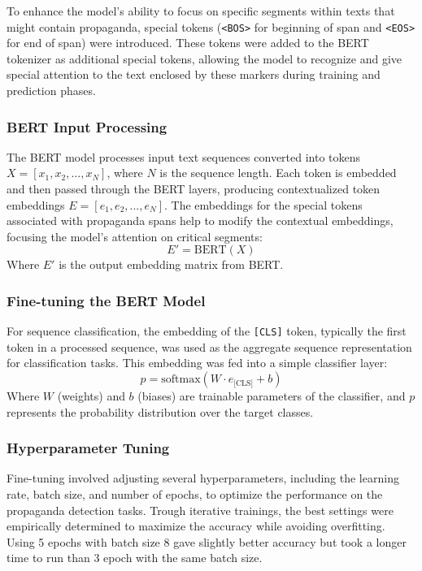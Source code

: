 \documentclass[twocolumn]{article}
\begin{document}
To enhance the model’s ability to focus on specific segments within texts that might contain propaganda, special tokens (\texttt{<BOS>} for beginning of span and \texttt{<EOS>} for end of span) were introduced. These tokens were added to the BERT tokenizer as additional special tokens, allowing the model to recognize and give special attention to the text enclosed by these markers during training and prediction phases.

\subsubsection*{BERT Input Processing}
The BERT model processes input text sequences converted into tokens \( X = [x_1, x_2, ..., x_N] \), where \( N \) is the sequence length. Each token is embedded and then passed through the BERT layers, producing contextualized token embeddings \( E = [e_1, e_2, ..., e_N] \). The embeddings for the special tokens associated with propaganda spans help to modify the contextual embeddings, focusing the model’s attention on critical segments:
\[ E' = \text{BERT}(X) \]
Where \( E' \) is the output embedding matrix from BERT.

\subsubsection*{Fine-tuning the BERT Model}
For sequence classification, the embedding of the \texttt{[CLS]} token, typically the first token in a processed sequence, was used as the aggregate sequence representation for classification tasks. This embedding was fed into a simple classifier layer:
\[ p = \text{softmax}(W \cdot e_{\text{[CLS]}} + b) \]
Where \( W \) (weights) and \( b \) (biases) are trainable parameters of the classifier, and \( p \) represents the probability distribution over the target classes.

\subsubsection*{Hyperparameter Tuning}
Fine-tuning involved adjusting several hyperparameters, including the learning rate, batch size, and number of epochs, to optimize the performance on the propaganda detection tasks. Trough iterative trainings, the best settings were empirically determined to maximize the accuracy while avoiding overfitting. Using 5 epochs with batch size 8 gave slightly better accuracy but took a longer time to run than 3 epoch with the same batch size.
\end{document}
